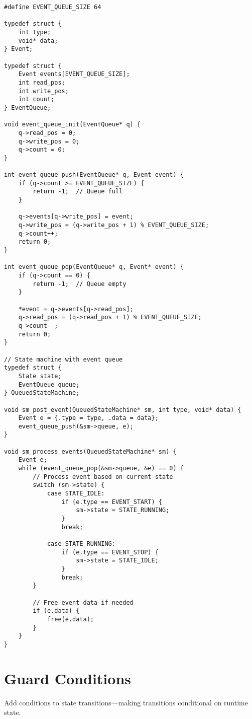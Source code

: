 \begin{lstlisting}
#define EVENT_QUEUE_SIZE 64

typedef struct {
    int type;
    void* data;
} Event;

typedef struct {
    Event events[EVENT_QUEUE_SIZE];
    int read_pos;
    int write_pos;
    int count;
} EventQueue;

void event_queue_init(EventQueue* q) {
    q->read_pos = 0;
    q->write_pos = 0;
    q->count = 0;
}

int event_queue_push(EventQueue* q, Event event) {
    if (q->count >= EVENT_QUEUE_SIZE) {
        return -1;  // Queue full
    }

    q->events[q->write_pos] = event;
    q->write_pos = (q->write_pos + 1) % EVENT_QUEUE_SIZE;
    q->count++;
    return 0;
}

int event_queue_pop(EventQueue* q, Event* event) {
    if (q->count == 0) {
        return -1;  // Queue empty
    }

    *event = q->events[q->read_pos];
    q->read_pos = (q->read_pos + 1) % EVENT_QUEUE_SIZE;
    q->count--;
    return 0;
}

// State machine with event queue
typedef struct {
    State state;
    EventQueue queue;
} QueuedStateMachine;

void sm_post_event(QueuedStateMachine* sm, int type, void* data) {
    Event e = {.type = type, .data = data};
    event_queue_push(&sm->queue, e);
}

void sm_process_events(QueuedStateMachine* sm) {
    Event e;
    while (event_queue_pop(&sm->queue, &e) == 0) {
        // Process event based on current state
        switch (sm->state) {
            case STATE_IDLE:
                if (e.type == EVENT_START) {
                    sm->state = STATE_RUNNING;
                }
                break;

            case STATE_RUNNING:
                if (e.type == EVENT_STOP) {
                    sm->state = STATE_IDLE;
                }
                break;
        }

        // Free event data if needed
        if (e.data) {
            free(e.data);
        }
    }
}
\end{lstlisting}

\section{Guard Conditions}

Add conditions to state transitions—making transitions conditional on runtime state.

